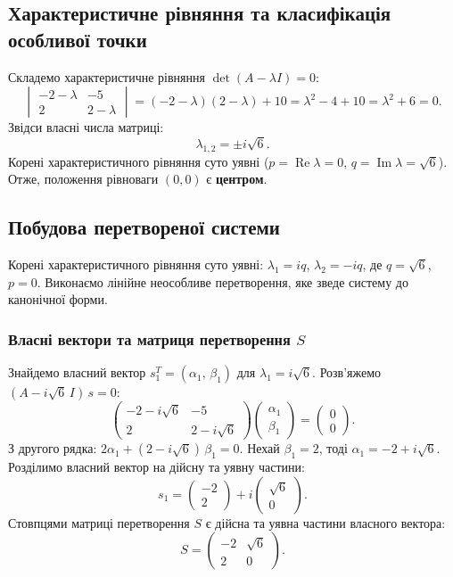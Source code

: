 \documentclass[12pt,a4paper]{article}
\begin{document}
\subsection{Характеристичне рівняння та класифікація особливої точки}

Складемо характеристичне рівняння $\det(A - \lambda I) = 0$:
\[
\begin{vmatrix}
-2-\lambda & -5\\
2 & 2-\lambda
\end{vmatrix}
= (-2-\lambda)(2-\lambda) + 10
= \lambda^2 - 4 + 10
= \lambda^2 + 6 = 0.
\]
Звідси власні числа матриці:
\[
\lambda_{1,2} = \pm i\sqrt{6}.
\]
Корені характеристичного рівняння суто уявні ($p = \operatorname{Re}\lambda = 0$, $q = \operatorname{Im}\lambda = \sqrt{6}$). Отже, положення рівноваги $(0,0)$ є \textbf{центром}.

\subsection{Побудова перетвореної системи}

Корені характеристичного рівняння суто уявні: $\lambda_1 = iq$, $\lambda_2 = -iq$, де $q = \sqrt{6}$, $p = 0$. Виконаємо лінійне неособливе перетворення, яке зведе систему до канонічної форми.

\subsubsection{Власні вектори та матриця перетворення $S$}

Знайдемо власний вектор $s_1^T = (\alpha_1,\,\beta_1)$ для $\lambda_1 = i\sqrt{6}$. Розв'яжемо $(A - i\sqrt{6}\,I)\,s = 0$:
\[
\begin{pmatrix}
-2-i\sqrt{6} & -5\\
2 & 2-i\sqrt{6}
\end{pmatrix}
\begin{pmatrix}
\alpha_1\\\beta_1
\end{pmatrix}
=
\begin{pmatrix}
0\\0
\end{pmatrix}.
\]
З другого рядка: $2\alpha_1 + (2 - i\sqrt{6})\,\beta_1 = 0$. Нехай $\beta_1 = 2$, тоді $\alpha_1 = -2 + i\sqrt{6}$. Розділимо власний вектор на дійсну та уявну частини:
\[
s_1 =
\begin{pmatrix}
-2\\2
\end{pmatrix}
+ i
\begin{pmatrix}
\sqrt{6}\\0
\end{pmatrix}.
\]
Стовпцями матриці перетворення $S$ є дійсна та уявна частини власного вектора:
\[
S =
\begin{pmatrix}
-2 & \sqrt{6}\\
2 & 0
\end{pmatrix}.
\]
\end{document}
